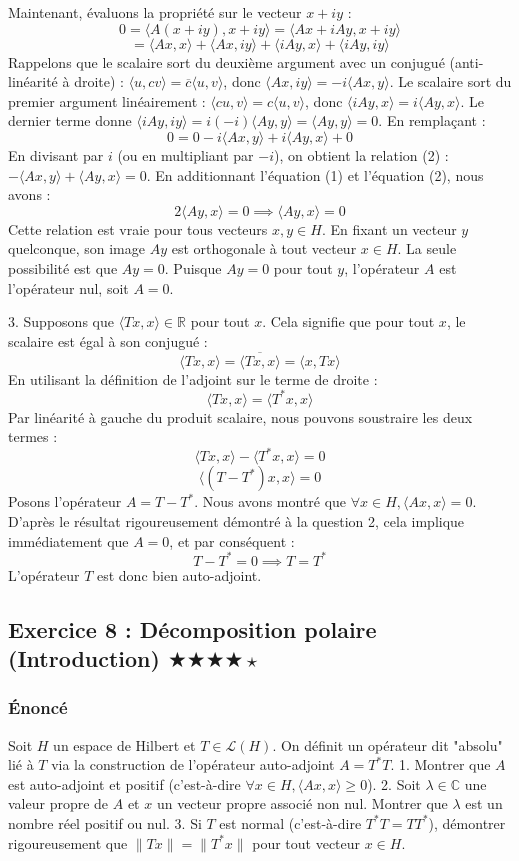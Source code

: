 \documentclass[11pt,a4paper]{article}
\begin{document}
Maintenant, évaluons la propriété sur le vecteur $x + iy$ :
$$ 0 = \langle A(x+iy), x+iy \rangle = \langle Ax + iAy, x+iy \rangle $$
$$ = \langle Ax, x \rangle + \langle Ax, iy \rangle + \langle iAy, x \rangle + \langle iAy, iy \rangle $$
Rappelons que le scalaire sort du deuxième argument avec un conjugué (anti-linéarité à droite) : $\langle u, cv \rangle = \overline{c} \langle u, v \rangle$, donc $\langle Ax, iy \rangle = -i \langle Ax, y \rangle$.
Le scalaire sort du premier argument linéairement : $\langle cu, v \rangle = c \langle u, v \rangle$, donc $\langle iAy, x \rangle = i \langle Ay, x \rangle$.
Le dernier terme donne $\langle iAy, iy \rangle = i(-i) \langle Ay, y \rangle = \langle Ay, y \rangle = 0$.
En remplaçant :
$$ 0 = 0 - i\langle Ax, y \rangle + i\langle Ay, x \rangle + 0 $$
En divisant par $i$ (ou en multipliant par $-i$), on obtient la relation (2) : $-\langle Ax, y \rangle + \langle Ay, x \rangle = 0$.
En additionnant l'équation (1) et l'équation (2), nous avons :
$$ 2 \langle Ay, x \rangle = 0 \implies \langle Ay, x \rangle = 0 $$
Cette relation est vraie pour tous vecteurs $x, y \in H$. En fixant un vecteur $y$ quelconque, son image $Ay$ est orthogonale à tout vecteur $x \in H$. La seule possibilité est que $Ay = 0$.
Puisque $Ay = 0$ pour tout $y$, l'opérateur $A$ est l'opérateur nul, soit $A = 0$.

3. Supposons que $\langle Tx, x \rangle \in \mathbb{R}$ pour tout $x$.
Cela signifie que pour tout $x$, le scalaire est égal à son conjugué :
$$ \langle Tx, x \rangle = \overline{\langle Tx, x \rangle} = \langle x, Tx \rangle $$
En utilisant la définition de l'adjoint sur le terme de droite :
$$ \langle Tx, x \rangle = \langle T^*x, x \rangle $$
Par linéarité à gauche du produit scalaire, nous pouvons soustraire les deux termes :
$$ \langle Tx, x \rangle - \langle T^*x, x \rangle = 0 $$
$$ \langle (T - T^*)x, x \rangle = 0 $$
Posons l'opérateur $A = T - T^*$. Nous avons montré que $\forall x \in H, \langle Ax, x \rangle = 0$.
D'après le résultat rigoureusement démontré à la question 2, cela implique immédiatement que $A = 0$, et par conséquent :
$$ T - T^* = 0 \implies T = T^* $$
L'opérateur $T$ est donc bien auto-adjoint.


\subsection*{Exercice 8 : Décomposition polaire (Introduction) $\bigstar\bigstar\bigstar\bigstar\star$}
\subsubsection*{Énoncé}
Soit $H$ un espace de Hilbert et $T \in \mathcal{L}(H)$.
On définit un opérateur dit "absolu" lié à $T$ via la construction de l'opérateur auto-adjoint $A = T^* T$.
1. Montrer que $A$ est auto-adjoint et positif (c'est-à-dire $\forall x \in H, \langle Ax, x \rangle \ge 0$).
2. Soit $\lambda \in \mathbb{C}$ une valeur propre de $A$ et $x$ un vecteur propre associé non nul. Montrer que $\lambda$ est un nombre réel positif ou nul.
3. Si $T$ est normal (c'est-à-dire $T^* T = T T^*$), démontrer rigoureusement que $\|Tx\| = \|T^*x\|$ pour tout vecteur $x \in H$.
\end{document}
